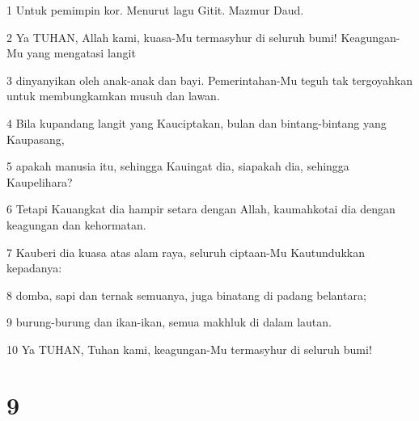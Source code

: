 \par 1 Untuk pemimpin kor. Menurut lagu Gitit. Mazmur Daud.
\par 2 Ya TUHAN, Allah kami, kuasa-Mu termasyhur di seluruh bumi! Keagungan-Mu yang mengatasi langit
\par 3 dinyanyikan oleh anak-anak dan bayi. Pemerintahan-Mu teguh tak tergoyahkan untuk membungkamkan musuh dan lawan.
\par 4 Bila kupandang langit yang Kauciptakan, bulan dan bintang-bintang yang Kaupasang,
\par 5 apakah manusia itu, sehingga Kauingat dia, siapakah dia, sehingga Kaupelihara?
\par 6 Tetapi Kauangkat dia hampir setara dengan Allah, kaumahkotai dia dengan keagungan dan kehormatan.
\par 7 Kauberi dia kuasa atas alam raya, seluruh ciptaan-Mu Kautundukkan kepadanya:
\par 8 domba, sapi dan ternak semuanya, juga binatang di padang belantara;
\par 9 burung-burung dan ikan-ikan, semua makhluk di dalam lautan.
\par 10 Ya TUHAN, Tuhan kami, keagungan-Mu termasyhur di seluruh bumi!

\chapter{9}


